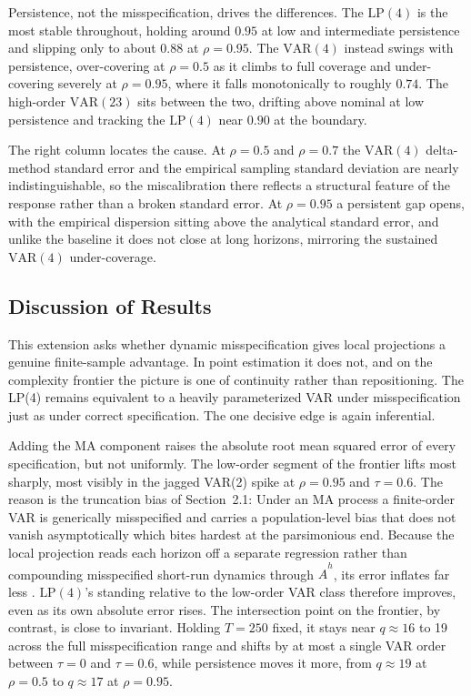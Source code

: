 Persistence, not the misspecification, drives the differences. The $\text{LP}(4)$ is the most 
stable throughout, holding around $0.95$ at low and intermediate persistence and slipping only 
to about $0.88$ at $\rho = 0.95$. The $\text{VAR}(4)$ instead swings with persistence, 
over-covering at $\rho = 0.5$ as it climbs to full coverage and under-covering severely at 
$\rho = 0.95$, where it falls monotonically to roughly $0.74$. The high-order $\text{VAR}(23)$ 
sits between the two, drifting above nominal at low persistence and tracking the $\text{LP}(4)$ 
near $0.90$ at the boundary.

The right column locates the cause. At $\rho = 0.5$ and $\rho = 0.7$ the $\text{VAR}(4)$ 
delta-method standard error and the empirical sampling standard deviation are nearly 
indistinguishable, so the miscalibration there reflects a structural feature of the response 
rather than a broken standard error. At $\rho = 0.95$ a persistent gap opens, with the empirical 
dispersion sitting above the analytical standard error, and unlike the baseline it does not 
close at long horizons, mirroring the sustained $\text{VAR}(4)$ under-coverage.

\FloatBarrier
\subsection{Discussion of Results}

This extension asks whether dynamic misspecification gives local projections a genuine 
finite-sample advantage. In point estimation it does not, and on the complexity frontier the 
picture is one of continuity rather than repositioning. The LP(4) remains equivalent to a 
heavily parameterized VAR under misspecification just as under correct specification. The one 
decisive edge is again inferential.

Adding the MA component raises the absolute root mean squared error of every specification, but 
not uniformly. The low-order segment of the frontier lifts most sharply, most visibly in the 
jagged VAR(2) spike at $\rho=0.95$ and $\tau=0.6$. The reason is the truncation bias of 
Section~2.1: Under an MA process a finite-order VAR is generically misspecified and carries a population-level bias that does not vanish asymptotically 
\parencite{braun1993misspecifications,ravenna2007vector} which bites hardest at the 
parsimonious end. Because the local projection reads each horizon off a separate regression 
rather than compounding misspecified short-run dynamics through $\hat{A}^{h}$, its error inflates 
far less \parencite{olea2024double}. $\text{LP}(4)$'s standing relative to the low-order VAR 
class therefore improves, even as its own absolute error rises. 
The intersection point on the frontier, by contrast, is close to invariant. Holding $T=250$ fixed, it stays near $q \approx 16$ to 19 across the full misspecification range and shifts by at most a single VAR order between 
$\tau=0$ and $\tau=0.6$, while persistence moves it more, from $q\approx 19$ at $\rho=0.5$ to 
$q\approx 17$ at $\rho=0.95$.

